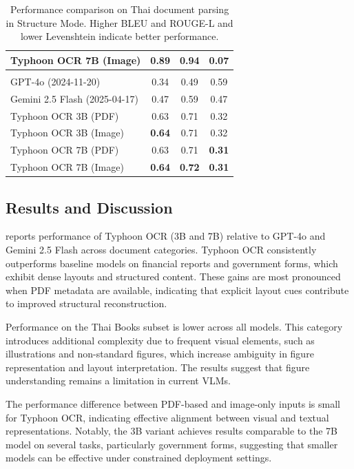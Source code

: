 \documentclass[]{typhoon} %
\begin{document}
\begin{table}[htbp]
\begin{tabular}{lccc}
        Typhoon OCR 7B (Image) & 0.89 & 0.94 & 0.07 \\
        \midrule
        \rowcolor{typhoonpurple!20}
        \multicolumn{4}{l}{\textbf{Thai Books}} \\
        GPT-4o (2024-11-20) & 0.34 & 0.49 & 0.59 \\
        Gemini 2.5 Flash (2025-04-17) & 0.47 & 0.59 & 0.47 \\
        Typhoon OCR 3B (PDF) & 0.63 & 0.71 & 0.32 \\
        Typhoon OCR 3B (Image) & \textbf{0.64} & 0.71 & 0.32 \\
        Typhoon OCR 7B (PDF) & 0.63 & 0.71 & \textbf{0.31} \\
        Typhoon OCR 7B (Image) & \textbf{0.64} & \textbf{0.72} & \textbf{0.31} \\
        \bottomrule
    \end{tabular}
    \caption{Performance comparison on Thai document parsing in Structure Mode. Higher BLEU and ROUGE-L and lower Levenshtein indicate better performance.}
    \label{tab:typhoon_eval}
\end{table}

\subsection{Results and Discussion}

 reports performance of Typhoon OCR (3B and 7B) relative to GPT-4o and Gemini 2.5 Flash across document categories. Typhoon OCR consistently outperforms baseline models on financial reports and government forms, which exhibit dense layouts and structured content. These gains are most pronounced when PDF metadata are available, indicating that explicit layout cues contribute to improved structural reconstruction.

Performance on the Thai Books subset is lower across all models. This category introduces additional complexity due to frequent visual elements, such as illustrations and non-standard figures, which increase ambiguity in figure representation and layout interpretation. The results suggest that figure understanding remains a limitation in current VLMs.

The performance difference between PDF-based and image-only inputs is small for Typhoon OCR, indicating effective alignment between visual and textual representations. Notably, the 3B variant achieves results comparable to the 7B model on several tasks, particularly government forms, suggesting that smaller models can be effective under constrained deployment settings.
\end{document}
